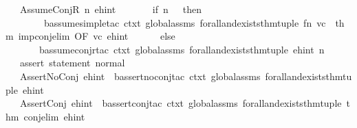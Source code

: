 \begin{isabellebody}
\ \ {\isacharbar}{\kern0pt}\ {\isacharparenleft}{\kern0pt}AssumeConjR\ n{\isacharcomma}{\kern0pt}\ ehint{\isacharparenright}{\kern0pt}\ {\isacharequal}{\kern0pt}{\isachargreater}{\kern0pt}\ \isanewline
\ \ \ \ \ if\ n\ {\isacharequal}{\kern0pt}\ {}\ then\isanewline
\ \ \ \ \ \ \ \ b{\isacharunderscore}{\kern0pt}assume{\isacharunderscore}{\kern0pt}simple{\isacharunderscore}{\kern0pt}tac\ ctxt\ global{\isacharunderscore}{\kern0pt}assms\ forall{\isacharunderscore}{\kern0pt}and{\isacharunderscore}{\kern0pt}exists{\isacharunderscore}{\kern0pt}thm{\isacharunderscore}{\kern0pt}tuple\ {\isacharparenleft}{\kern0pt}fn\ {\isacharparenleft}{\kern0pt}vc{\isacharparenright}{\kern0pt}\ {\isacharequal}{\kern0pt}{\isachargreater}{\kern0pt}\ {\isacharat}{\kern0pt}{\isacharbraceleft}{\kern0pt}thm\ imp{\isacharunderscore}{\kern0pt}conj{\isacharunderscore}{\kern0pt}elim{\isacharbraceright}{\kern0pt}\ OF\ {\isacharbrackleft}{\kern0pt}vc{\isacharbrackright}{\kern0pt}{\isacharparenright}{\kern0pt}\ ehint\ {}\isanewline
\ \ \ \ \ else\isanewline
\ \ \ \ \ \ \ b{\isacharunderscore}{\kern0pt}assume{\isacharunderscore}{\kern0pt}conjr{\isacharunderscore}{\kern0pt}tac\ ctxt\ global{\isacharunderscore}{\kern0pt}assms\ forall{\isacharunderscore}{\kern0pt}and{\isacharunderscore}{\kern0pt}exists{\isacharunderscore}{\kern0pt}thm{\isacharunderscore}{\kern0pt}tuple\ ehint\ n\isanewline
\ \ {\isacharparenleft}{\kern0pt}{\isacharasterisk}{\kern0pt}\ assert\ statement\ normal\ {\isacharasterisk}{\kern0pt}{\isacharparenright}{\kern0pt}\isanewline
\ \ {\isacharbar}{\kern0pt}\ {\isacharparenleft}{\kern0pt}AssertNoConj{\isacharcomma}{\kern0pt}\ ehint{\isacharparenright}{\kern0pt}\ {\isacharequal}{\kern0pt}{\isachargreater}{\kern0pt}\ b{\isacharunderscore}{\kern0pt}assert{\isacharunderscore}{\kern0pt}no{\isacharunderscore}{\kern0pt}conj{\isacharunderscore}{\kern0pt}tac\ ctxt\ global{\isacharunderscore}{\kern0pt}assms\ forall{\isacharunderscore}{\kern0pt}and{\isacharunderscore}{\kern0pt}exists{\isacharunderscore}{\kern0pt}thm{\isacharunderscore}{\kern0pt}tuple\ ehint\isanewline
\ \ {\isacharbar}{\kern0pt}\ {\isacharparenleft}{\kern0pt}AssertConj{\isacharcomma}{\kern0pt}\ ehint{\isacharparenright}{\kern0pt}\ {\isacharequal}{\kern0pt}{\isachargreater}{\kern0pt}\ b{\isacharunderscore}{\kern0pt}assert{\isacharunderscore}{\kern0pt}conj{\isacharunderscore}{\kern0pt}tac\ ctxt\ global{\isacharunderscore}{\kern0pt}assms\ forall{\isacharunderscore}{\kern0pt}and{\isacharunderscore}{\kern0pt}exists{\isacharunderscore}{\kern0pt}thm{\isacharunderscore}{\kern0pt}tuple\ {\isacharparenleft}{\kern0pt}{\isacharat}{\kern0pt}{\isacharbraceleft}{\kern0pt}thm\ conj{\isacharunderscore}{\kern0pt}elim{\isacharunderscore}{\kern0pt}{}{\isacharbraceright}{\kern0pt}{\isacharparenright}{\kern0pt}\ ehint\isanewline

\end{isabellebody}
